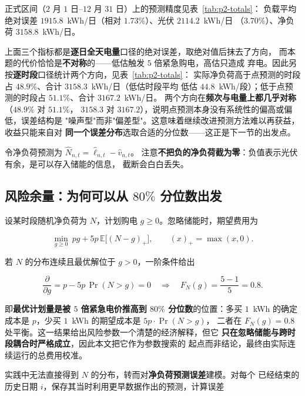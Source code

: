 \documentclass[withoutpreface,bwprint]{cumcmthesis}
\begin{document}
正式区间（$2$ 月 $1$ 日--$12$ 月 $31$ 日）上的预测精度见表~\ref{tab:p2-totals}：
负载平均绝对误差 $1915.8$~kWh/日（相对 $1.73\%$）、光伏 $2114.2$~kWh/日
（$3.70\%$）、净负荷 $3158.8$~kWh/日。

上面三个指标都是\textbf{逐日全天电量}口径的绝对误差，取绝对值后抹去了方向，
而本题的代价恰恰是\textbf{不对称}的——低估触发 $5$ 倍紧急购电，高估只造成
弃电。因此另按\textbf{逐时段}口径统计两个方向，见表~\ref{tab:p2-totals}：
实际净负荷高于点预测的时段占 $48.9\%$、合计 $3158.3$~kWh/日（低估时段平均
低估 $44.8$~kWh/段）；低于点预测的时段占 $51.1\%$、合计 $3167.2$~kWh/日。
两个方向在\textbf{频次与电量上都几乎对称}（$48.9\%$ 对 $51.1\%$，
$3158.3$ 对 $3167.2$），说明点预测本身没有系统性的偏高或偏低，误差结构是
"噪声型"而非"偏差型"。这意味着继续改进预测方法难以再获益，收益只能来自对
\textbf{同一个误差分布}选取合适的分位数——这正是下一节的出发点。

令净负荷预测为 $\widehat N_{n,t}=\widehat\ell_{n,t}-\widehat v_{n,t}$。
注意\textbf{不把负的净负荷截为零}：负值表示光伏有余，是可以存入储能的信息，
截断会白白丢失。

\subsection{风险余量：为何可以从 $80\%$ 分位数出发}

设某时段随机净负荷为 $N$，计划购电 $g\ge 0$。忽略储能时，期望费用为

\begin{equation}
  \min_{g\ge0}\ pg+5p\,\mathbb{E}\bigl[(N-g)_+\bigr],
  \qquad (x)_+=\max(x,0).
  \label{eq:p2-newsvendor}
\end{equation}

若 $N$ 的分布连续且最优解位于 $g>0$，一阶条件给出

\begin{equation}
  \frac{\partial}{\partial g}=p-5p\,\Pr(N>g)=0
  \quad\Longrightarrow\quad
  F_N(g)=\frac{5-1}{5}=0.8 .
  \label{eq:p2-critical}
\end{equation}

即\textbf{最优计划量是被 $5$ 倍紧急电价推高到 $80\%$ 分位数}的位置：多买
$1$~kWh 的确定成本是 $p$，少买 $1$~kWh 的期望成本是 $5p\cdot\Pr(N>g)$，
二者在 $F_N(g)=0.8$ 处平衡。这一结果给出风险参数一个清楚的经济解释，但它
\textbf{只在忽略储能与跨时段耦合时严格成立}，因此本文把它作为参数搜索的
起点而非结论，最终由实际连续运行的总费用校准。

实践中无法直接得到 $N$ 的分布，转而对\textbf{净负荷预测误差}建模。对每个
已经结束的历史日期 $i$，保存其当时利用更早数据作出的预测，计算误差
\end{document}
